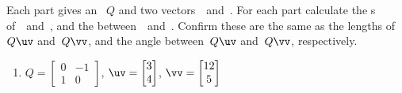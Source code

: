 \begin{exercise} \label{ex:preserve} 
Each part gives an ~\(Q\) and two vectors~\uv\ and~\vv.  
For each part calculate the s of~\uv\ and~\vv, and the  between~\uv\ and~\vv.
Confirm these are the same as the lengths of~\(Q\uv\) and~\(Q\vv\), and the angle between~\(Q\uv\) and~\(Q\vv\), respectively.

\begin{enumerate}
\item \(Q=\begin{bmatrix} 0&-1\\1&0 \end{bmatrix}\), 
\(\uv=\begin{bmatrix} 3\\4 \end{bmatrix}\),
\(\vv=\begin{bmatrix} 12\\5 \end{bmatrix}\)



\end{enumerate}
\end{exercise}
